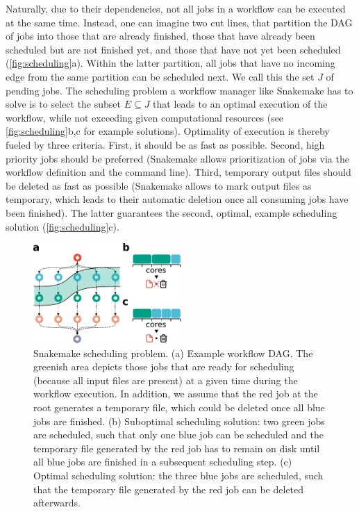 \documentclass[parskip=half]{scrartcl}
\begin{document}
Naturally, due to their dependencies, not all jobs in a workflow can be executed at the same time.
Instead, one can imagine two cut lines, that partition the DAG of jobs into those that are already finished, those that have already been scheduled but are not finished yet, and those that have not yet been scheduled (\autoref{fig:scheduling}a).
Within the latter partition, all jobs that have no incoming edge from the same partition can be scheduled next.
We call this the set $J$ of pending jobs.
The scheduling problem a workflow manager like Snakemake has to solve is to select the subset $E \subseteq J$ that leads to an optimal execution of the workflow, while not exceeding given computational resources (see \autoref{fig:scheduling}b,c for example solutions).
Optimality of execution is thereby fueled by three criteria.
First, it should be as fast as possible.
Second, high priority jobs should be preferred (Snakemake allows prioritization of jobs via the workflow definition and the command line).
Third, temporary output files should be deleted as fast as possible (Snakemake allows to mark output files as temporary, which leads to their automatic deletion once all consuming jobs have been finished).
The latter guarantees the second, optimal, example scheduling solution (\autoref{fig:scheduling}c).

\begin{figure}
	\centering
	\includegraphics[width=0.5\textwidth]{scheduling.pdf}
	\caption{Snakemake scheduling problem. (a) Example workflow DAG.
		The greenish area depicts those jobs that are ready for scheduling (because all input files are present) at a given time during the workflow execution.
		In addition, we assume that the red job at the root generates a temporary file, which could be deleted once all blue jobs are finished.
		(b) Suboptimal scheduling solution: two green jobs are scheduled, such that only one blue job can be scheduled and the temporary file generated by the red job has to remain on disk until all blue jobs are finished in a subsequent scheduling step. (c) Optimal scheduling solution: the three blue jobs are scheduled, such that the temporary file generated by the red job can be deleted afterwards.}\label{fig:scheduling}
\end{figure}
\end{document}
